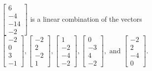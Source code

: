 \begin{exercise}
\begin{exerciseStatement}
  \end{exerciseStatement}
  \begin{exerciseAnswer}
   \(\left[\begin{array}{c}
6 \\
-4 \\
-14 \\
-2
\end{array}\right]\) 
  	 is  
	a linear combination of the vectors \(\left[\begin{array}{c}
-2 \\
0 \\
3 \\
-1
\end{array}\right] , \left[\begin{array}{c}
-2 \\
2 \\
-2 \\
1
\end{array}\right] , \left[\begin{array}{c}
1 \\
-2 \\
-4 \\
-2
\end{array}\right] , \left[\begin{array}{c}
0 \\
-3 \\
4 \\
-2
\end{array}\right] , \text{ and } \left[\begin{array}{c}
-2 \\
2 \\
-4 \\
0
\end{array}\right]\).

	
  


  \end{exerciseAnswer}
\end{exercise}